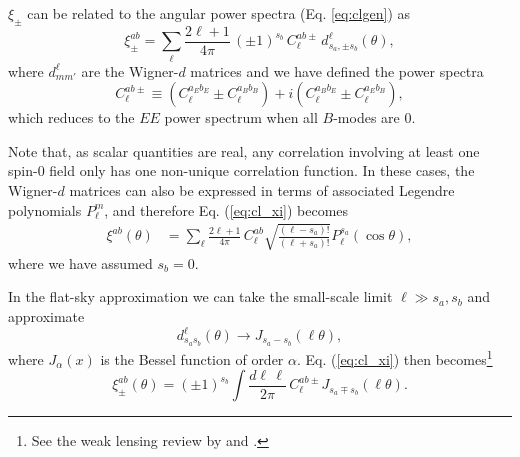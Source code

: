 \documentclass[\docopts]{\docclass}
\begin{document}
$\xi_{\pm}$ can be related to the angular power spectra (Eq. \ref{eq:clgen}) as
\begin{equation}\label{eq:cl_xi}
 \xi^{ab}_\pm = \sum_\ell\frac{2\ell+1}{4\pi}\,(\pm1)^{s_b}\,C^{ab\pm}_\ell\,d^\ell_{s_a,\pm s_b}(\theta),
\end{equation}
where $d^\ell_{mm'}$ are the Wigner-$d$ matrices \citep{Ng1999,2004MNRAS.350..914C} and we have defined the power spectra
\begin{equation}
  C^{ab\pm}_\ell\equiv\left(C^{a_Eb_E}_\ell\pm C^{a_Bb_B}_\ell\right)+i\left(C^{a_Bb_E}_\ell\pm C^{a_Eb_B}_\ell\right),
\end{equation}
which reduces to the $EE$ power spectrum when all $B$-modes are 0.

Note that, as scalar quantities are real, any correlation involving at least one spin-$0$ field only has one non-unique correlation function. In these cases, the Wigner-$d$ matrices can also be expressed in terms of associated Legendre polynomials $P^m_\ell$, and therefore Eq. (\ref{eq:cl_xi}) becomes
\begin{align}
  \xi^{ab}(\theta)&=\sum_\ell\frac{2\ell+1}{4\pi}\,C^{ab}_\ell\sqrt{\frac{(\ell-s_a)!}{(\ell+s_a)!}}P^{s_a}_\ell(\cos\theta)\label{eq:xigg},
\end{align}
where we have assumed $s_b=0$.

In the flat-sky approximation we can take the small-scale limit $\ell\gg s_a,s_b$ and approximate 
\begin{equation}
  d_{s_as_b}^\ell(\theta)\longrightarrow J_{s_a-s_b}(\ell\theta),
\end{equation}
where $J_\alpha(x)$ is the Bessel function of order $\alpha$. Eq. (\ref{eq:cl_xi}) then becomes\footnote{See the weak lensing review by \citet{Bartelmann01} and \citet{Joachimi10}.}
\begin{equation}
  \xi^{ab}_{\pm}(\theta)=\left(\pm1\right)^{s_b}\int\frac{d\ell\,\ell}{2\pi}\,C^{ab\pm}_\ell J_{s_a\mp s_b}(\ell\theta).
\end{equation}
\end{document}
